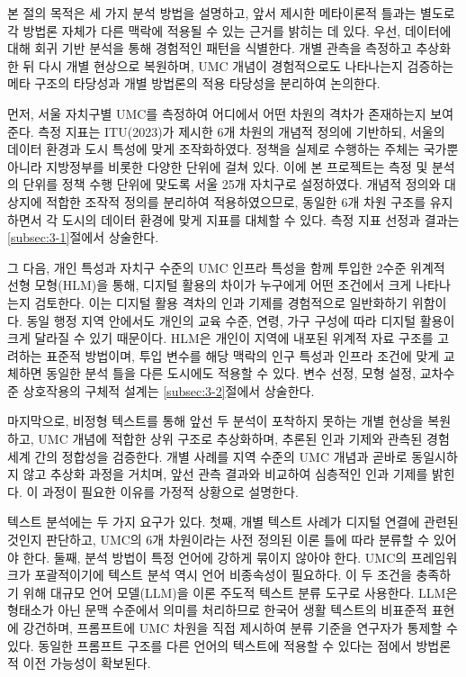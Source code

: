 본 절의 목적은 세 가지 분석 방법을 설명하고, 앞서 제시한 메타이론적 틀과는 별도로 각 방법론 자체가 다른 맥락에 적용될 수 있는 근거를 밝히는 데 있다. 우선, 데이터에 대해 회귀 기반 분석을 통해 경험적인 패턴을 식별한다. 개별 관측을 측정하고 추상화한 뒤 다시 개별 현상으로 복원하며, UMC 개념이 경험적으로도 나타나는지 검증하는 메타 구조의 타당성과 개별 방법론의 적용 타당성을 분리하여 논의한다.

먼저, 서울 자치구별 UMC를 측정하여 어디에서 어떤 차원의 격차가 존재하는지 보여준다. 측정 지표는 ITU(2023)가 제시한 6개 차원의 개념적 정의에 기반하되, 서울의 데이터 환경과 도시 특성에 맞게 조작화하였다. 정책을 실제로 수행하는 주체는 국가뿐 아니라 지방정부를 비롯한 다양한 단위에 걸쳐 있다. 이에 본 프로젝트는 측정 및 분석의 단위를 정책 수행 단위에 맞도록 서울 25개 자치구로 설정하였다. 개념적 정의와 대상지에 적합한 조작적 정의를 분리하여 적용하였으므로, 동일한 6개 차원 구조를 유지하면서 각 도시의 데이터 환경에 맞게 지표를 대체할 수 있다. 측정 지표 선정과 결과는 \ref{subsec:3-1}절에서 상술한다.

그 다음, 개인 특성과 자치구 수준의 UMC 인프라 특성을 함께 투입한 2수준 위계적 선형 모형(HLM)을 통해, 디지털 활용의 차이가 누구에게 어떤 조건에서 크게 나타나는지 검토한다. 이는 디지털 활용 격차의 인과 기제를 경험적으로 일반화하기 위함이다. 동일 행정 지역 안에서도 개인의 교육 수준, 연령, 가구 구성에 따라 디지털 활용이 크게 달라질 수 있기 때문이다. HLM은 개인이 지역에 내포된 위계적 자료 구조를 고려하는 표준적 방법이며, 투입 변수를 해당 맥락의 인구 특성과 인프라 조건에 맞게 교체하면 동일한 분석 틀을 다른 도시에도 적용할 수 있다. 변수 선정, 모형 설정, 교차수준 상호작용의 구체적 설계는 \ref{subsec:3-2}절에서 상술한다.

마지막으로, 비정형 텍스트를 통해 앞선 두 분석이 포착하지 못하는 개별 현상을 복원하고, UMC 개념에 적합한 상위 구조로 추상화하며, 추론된 인과 기제와 관측된 경험 세계 간의 정합성을 검증한다. 개별 사례를 지역 수준의 UMC 개념과 곧바로 동일시하지 않고 추상화 과정을 거치며, 앞선 관측 결과와 비교하여 심층적인 인과 기제를 밝힌다. 이 과정이 필요한 이유를 가정적 상황으로 설명한다.

텍스트 분석에는 두 가지 요구가 있다. 첫째, 개별 텍스트 사례가 디지털 연결에 관련된 것인지 판단하고, UMC의 6개 차원이라는 사전 정의된 이론 틀에 따라 분류할 수 있어야 한다. 둘째, 분석 방법이 특정 언어에 강하게 묶이지 않아야 한다. UMC의 프레임워크가 포괄적이기에 텍스트 분석 역시 언어 비종속성이 필요하다. 이 두 조건을 충족하기 위해 대규모 언어 모델(LLM)을 이론 주도적 텍스트 분류 도구로 사용한다. LLM은 형태소가 아닌 문맥 수준에서 의미를 처리하므로 한국어 생활 텍스트의 비표준적 표현에 강건하며, 프롬프트에 UMC 차원을 직접 제시하여 분류 기준을 연구자가 통제할 수 있다. 동일한 프롬프트 구조를 다른 언어의 텍스트에 적용할 수 있다는 점에서 방법론적 이전 가능성이 확보된다.

